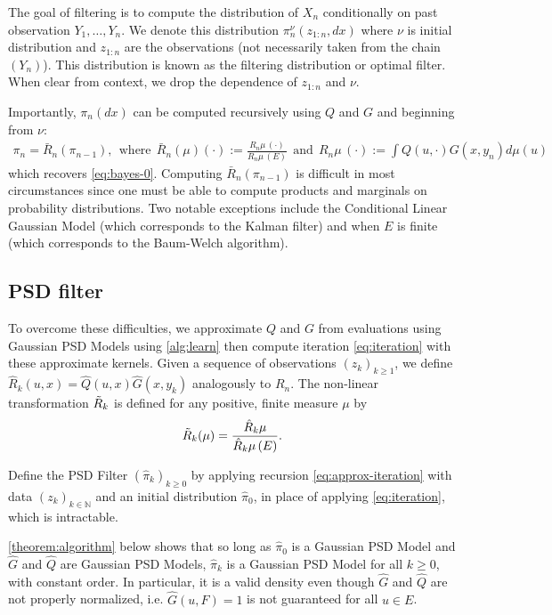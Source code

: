 The goal of filtering is to compute the distribution of $X_n$ conditionally on past observation $Y_1, \ldots, Y_n$. We denote this distribution $\pi_n^\nu(z_{1:n}, dx)$ where $\nu$ is initial distribution and $z_{1:n}$ are the observations (not necessarily taken from the chain $(Y_n)$). This distribution is known as the filtering distribution or optimal filter. When clear from context, we drop the dependence of $z_{1:n}$ and $\nu$.

Importantly, $\pi_n(dx)$ can be computed recursively using $Q$ and $G$ and beginning from $\nu$:
\begin{align}\label{eq:iteration}
\pi_n = \bar{R}_n(\pi_{n-1}), ~~\textrm{where}~~ \bar{R}_n(\mu)(\cdot) := \frac{R_n \mu \, (\cdot)}{R_n\mu\,(E)} ~~\textrm{and}~~  R_n \mu \, (\cdot) := \int Q(u, \cdot)G(x, y_n) d\mu(u)
\end{align}
which recovers \cref{eq:bayes-0}. Computing $\bar R_n(\pi_{n-1})$ is difficult in most circumstances since one must be able to compute products and marginals on probability distributions. Two notable exceptions include the Conditional Linear Gaussian Model (which corresponds to the Kalman filter) and when $E$ is finite (which corresponds to the Baum-Welch algorithm).


\subsection{PSD filter}\label{sec:psdfilter}
To overcome these difficulties, we approximate $Q$ and $G$ from evaluations using Gaussian PSD Models using \cref{alg:learn} then compute iteration \cref{eq:iteration} with these approximate kernels. Given a sequence of observations $(z_k)_{k\geq 1}$, we define $\hat R_k(u, x) = \hat Q(u, x)\hat G(x, y_k)$ analogously to $R_n$. The non-linear transformation $\tilde{{R}}_k$ is defined for any positive, finite measure $\mu$ by
\begin{align}\label{eq:approx-iteration}
    \tilde{{R}}_k (\mu) = \frac{\hat R_k\mu}{\hat R_k\mu\,(E)}.
\end{align}
%

Define the PSD Filter $(\hat \pi_k)_{k\geq 0}$ by applying recursion \cref{eq:approx-iteration} with data $(z_{k})_{k\in\mathbb N}$ and an initial distribution $\hat \pi_0$, in place of applying \cref{eq:iteration}, which is intractable.

\cref{theorem:algorithm} below shows that so long as $\hat \pi_0$ is a Gaussian PSD Model and $\hat G$ and $\hat Q$ are Gaussian PSD Models, $\hat \pi_k$ is a Gaussian PSD Model for all $k\geq 0$, with constant order. In particular, it is a valid density even though $\hat G$ and $\hat Q$ are not properly normalized, i.e. $\hat G(u, F)=1$ is not guaranteed for all $u\in E$.

